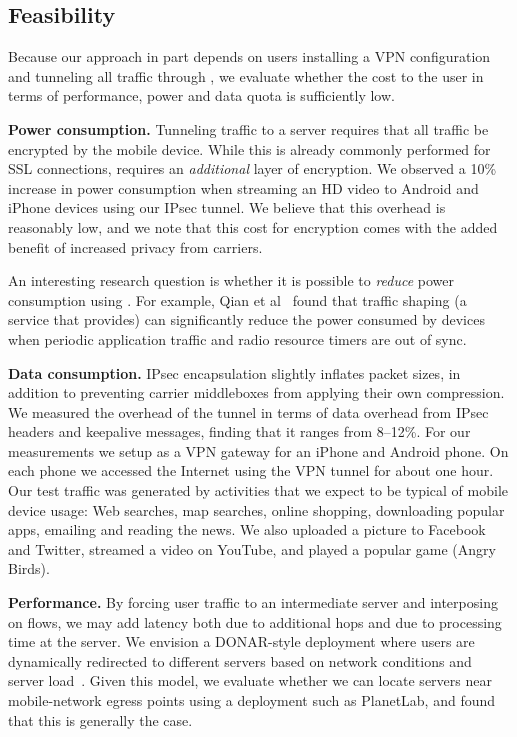 \subsection{Feasibility}
\label{subsec:cost}
Because our approach in part depends on users installing a VPN configuration and tunneling all traffic through \meddle, we evaluate whether the cost to the user in terms of performance, power and data quota is sufficiently low.

\noindent\textbf{Power consumption.} Tunneling traffic to a \meddle
server requires that all traffic be encrypted by the mobile
device. While this is already commonly performed for SSL connections,
\meddle requires an \emph{additional} layer of encryption. We observed
a 10\% increase in power consumption when streaming an HD video to
Android and iPhone devices using our IPsec tunnel. We believe that this 
overhead is reasonably low, and we note that this cost for encryption comes with the added benefit of increased 
privacy from carriers.

An interesting research question is whether it is possible to \emph{reduce} power consumption using \meddle. For example, Qian et al~\cite{qian:rrc,qian:aro,qian:periodic} found that traffic shaping (a service that \meddle provides) can significantly reduce the power consumed by devices when periodic application traffic and radio resource timers are out of sync.

  
\noindent\textbf{Data consumption.} IPsec encapsulation slightly inflates packet sizes, in addition to
preventing carrier middleboxes from applying their own compression. We
measured the overhead of the tunnel in terms of data overhead from IPsec 
headers and keepalive
messages, finding that it ranges from 8--12\%. For our measurements we setup \meddle
as a VPN gateway for an iPhone and Android phone. On each phone
we accessed the Internet using the VPN tunnel for about one hour. Our
test traffic was generated by activities that we expect to be typical of mobile 
device usage: Web searches, map searches, online shopping, 
downloading popular apps, emailing and reading the news. We also uploaded a picture to 
Facebook and Twitter, streamed a video on YouTube, and played a popular game (Angry Birds). 

\noindent\textbf{Performance.} By forcing user traffic to an
intermediate server and interposing on flows, we may add latency both
due to additional hops and due to processing time at the \meddle
server. We envision a DONAR-style deployment where users are
dynamically redirected to different \meddle servers based on network
conditions and server load~\cite{wendell:donar}. Given this model, we
evaluate whether we can locate servers near mobile-network egress
points using a deployment such as PlanetLab, and found that this is
generally the case.


